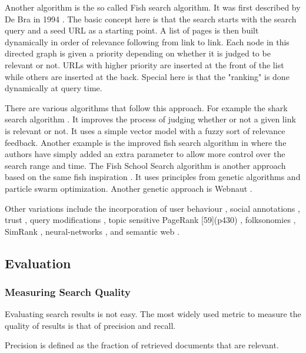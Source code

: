 Another algorithm is the so called Fish search algorithm. It was first described by De Bra in 1994 \citep{Debra1994, Debra1994a, Debra}. The basic concept here is that the search starts with the search query and a seed URL as a starting point. A list of pages is then built dynamically in order of relevance following from link to link. Each node in this directed graph is given a priority depending on whether it is judged to be relevant or not. URLs with higher priority are inserted at the front of the list while others are inserted at the back. Special here is that the "ranking" is done dynamically at query time.

There are various algorithms that follow this approach. For example the shark search algorithm \citep{Hersovici1998}. It improves the process of judging whether or not a given link is relevant or not. It uses a simple vector model with a fuzzy sort of relevance feedback. Another example is the improved fish search algorithm in \citep{Luo2005} where the authors have simply added an extra parameter to allow more control over the search range and time. The Fish School Search algorithm is another approach based on the same fish inspiration \citep{BastosFilho2008}. It uses principles from genetic algorithms and particle swarm optimization. Another genetic approach is Webnaut \citep{Nick2001}.

Other variations include the incorporation of user behaviour \citep{Agichtein2006}, social annotations \citep{Bao2007}, trust \citep{Garcia-Molina2004}, query modifications \citep{Glover2001}, topic sensitive PageRank [59](p430) \citep{Haveliwala2003}, folksonomies \citep{Hotho}, SimRank \citep{Jeh}, neural-networks \citep{Shu1999}, and semantic web \citep{Widyantoro2001,Du2007,Ding,Kamps,Taye2009}.

\subsection{Evaluation}

\subsubsection{Measuring Search Quality}

Evaluating search results is not easy. The most widely used metric to measure the quality of results is that of precision and recall.

Precision is defined as the fraction of retrieved documents that are relevant.

